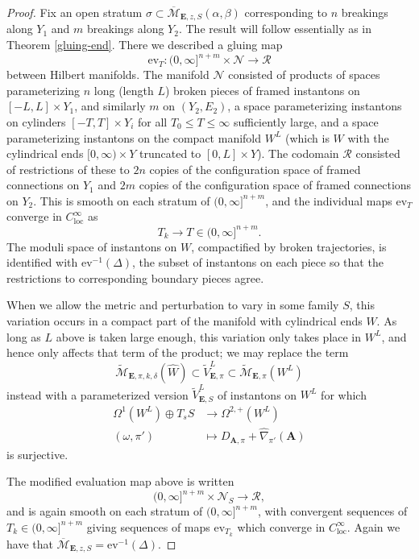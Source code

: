 \documentclass[10pt,a4paper]{amsart}
\theoremstyle{definition}
\theoremstyle{remark}
\numberwithin{figure}{qchap}
\begin{document}
\begin{proof}Fix an open stratum $\sigma \subset \overline{\mathcal M}_{\mathbf{E},z,S}(\alpha, \beta)$ corresponding to $n$ breakings along $Y_1$ and $m$ breakings along $Y_2$. The result will follow essentially as in Theorem \ref{gluing-end}. There we described a gluing map $$\text{ev}_T: (0,\infty]^{n+m} \times \mathcal N \to \mathcal R$$ between Hilbert manifolds. The manifold $\mathcal N$ consisted of products of spaces parameterizing $n$ long (length $L$) broken pieces of framed instantons on $[-L, L] \times Y_1$, and similarly $m$ on $(Y_2, E_2)$, a space parameterizing instantons on cylinders $[-T, T] \times Y_i$ for all $T_0 \leq T \leq \infty$ sufficiently large, and a space parameterizing instantons on the compact manifold $W^L$ (which is $W$ with the cylindrical ends $[0, \infty) \times Y$ truncated to $[0, L] \times Y$). The codomain $\mathcal R$ consisted of restrictions of these to $2n$ copies of the configuration space of framed connections on $Y_1$ and $2m$ copies of the configuration space of framed connections on $Y_2$. This is smooth on each stratum of $(0,\infty]^{n+m}$, and the individual maps $\text{ev}_T$ converge in $C^\infty_{\text{loc}}$ as
$$T_k \to T \in (0,\infty]^{n+m}.$$
The moduli space of instantons on $W$, compactified by broken trajectories, is identified with $\text{ev}^{-1}(\Delta)$, the subset of instantons on each piece so that the restrictions to corresponding boundary pieces agree.

When we allow the metric and perturbation to vary in some family $S$, this variation occurs in a compact part of the manifold with cylindrical ends $\hat W$. As long as $L$ above is taken large enough, this variation only takes place in $W^L$, and hence only affects that term of the product; we may replace the term
$$\widetilde{\mathcal M}_{\mathbf{E},\pi,k,\delta}(\hat W) \subset \widetilde V^L_{\mathbf{E},\pi} \subset \widetilde{\mathcal M}_{\mathbf{E},\pi}(W^L)$$
instead with a parameterized version $\widetilde{V}^L_{\mathbf{E},S}$ of instantons on $W^L$ for which
\begin{align*}\Omega^1(W^L) \oplus T_s S &\to \Omega^{2,+}(W^L)\\
(\omega, \pi') &\mapsto D_{\mathbf{A},\pi} + \widehat{\nabla}_{\pi'}(\mathbf{A})\end{align*}
is surjective.

The modified evaluation map above is written
$$(0,\infty]^{n+m} \times \mathcal N_S \to \mathcal R,$$
and is again smooth on each stratum of $(0,\infty]^{n+m}$, with convergent sequences of $T_k \in (0,\infty]^{n+m}$ giving sequences of maps $\text{ev}_{T_k}$ which converge in $C^\infty_{\text{loc}}$. Again we have that $\overline{\mathcal M}_{\mathbf{E},z,S} = \text{ev}^{-1}(\Delta)$.


\end{proof}
\end{document}
